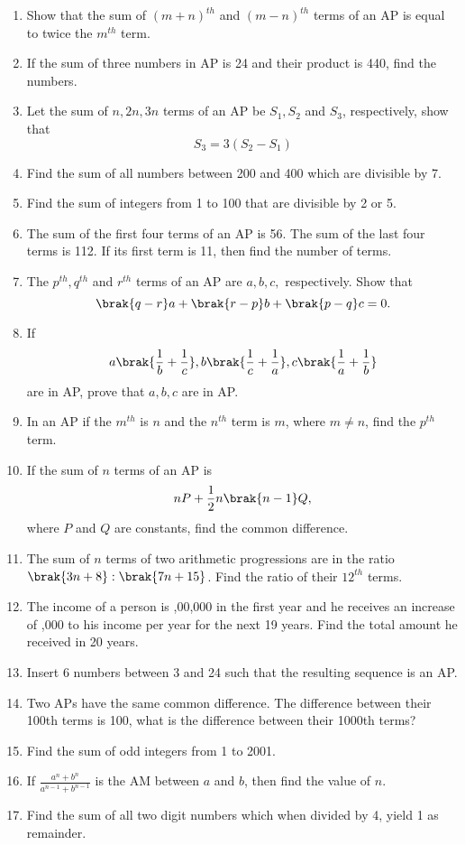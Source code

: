 \begin{enumerate}[label=\thesubsection.\arabic*, ref=\thesubsection.\theenumi]
\item Show that the sum of $(m + n)^{th}$ and $(m - n)^{th}$ terms of an AP is equal to twice the $m^{th}$ term.
\item If the sum of three numbers in AP  is 24 and their product is 440,  find the numbers.
\item Let the sum of $n,  2n,  3n$ terms of an AP be $S_1,  S_2$ and $S_3$,  respectively,  show that 
$$S_3 = 3(S_2 - S_1)$$
\item Find the sum of all numbers between 200 and 400 which are divisible by 7.
\item Find the sum of integers from 1 to 100 that are divisible by 2 or 5.
\item  The sum of the first four terms of an AP  is 56. The sum of the last four terms is 112. If its first term is 11, then find the number of terms.
\item The $p^{th}, q^{th}$ and $r^{th}$ terms of an AP  are $a, b, c,$ respectively. Show that 
$$\brak{q - r }a + \brak{r - p }b + \brak{p - q }c = 0.$$
\item If $$a\brak{\frac{1}{b}+\frac{1}{c}}, b\brak{\frac{1}{c}+\frac{1}{a}}, c\brak{\frac{1}{a}+\frac{1}{b}}$$ are in AP, prove that $a, b, c$ are in AP. 
\item In an AP if the $m^{th}$ is $n$ and the $n^{th}$ term is $m$, where $m \ne n$, find the $p^{th}$ term.
\item If the sum of $n$ terms of an AP is
	$$nP+\frac{1}{2} n\brak{n-1}Q,$$
	where $P$ and $Q$ are constants, find the common difference.
\item The sum of $n$ terms of two arithmetic progressions are in the ratio
	$\brak{3n+8}:\brak{7n+15}$.  Find the ratio of their $12^{th}$ terms.
\item The income of a person is ,00,000 in the first year and he receives an increase of ,000 to his income per year for the next 19 years.  Find the total amount he received in 20 years.
\item Insert 6 numbers between 3 and 24 such that the resulting sequence is an AP.
\item Two APs have the same common difference. The difference between their 100th terms is 100,  what is the difference between their 1000th terms?
\item Find the sum of odd integers from 1 to 2001.
\item If $\frac{a^n+b^n}{a^{n-1}+b^{n-1}}$ is the AM  between $a$ and $b$,  then find the value of $n$.
\item Find the sum of all two digit numbers which when divided by 4,  yield 1 as remainder.

\end{enumerate}
